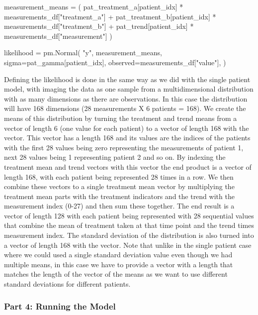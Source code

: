 \documentclass[12pt,a4paper,leqno]{report}
\theoremstyle{plain}
\theoremstyle{definition}
\theoremstyle{remark}
\begin{document}
\bigskip
\begin{pyverbatim}[][fontsize=\footnotesize]
    measurement_means = (
        pat_treatment_a[patient_idx] * measurements_df["treatment_a"]
        + pat_treatment_b[patient_idx] * measurements_df["treatment_b"]
        + pat_trend[patient_idx] * measurements_df["measurement"]
    )

    likelihood = pm.Normal(
        "y",
        measurement_means,
        sigma=pat_gamma[patient_idx],
        observed=measurements_df["value"],
    )
\end{pyverbatim}
\smallskip


Defining the likelihood is done in the same way as we did with the single patient model,
with imaging the data as one sample from a multidimensional distribution with as many
dimensions as there are observations. In this case the
distribution will have 168 dimensions (28 measurements X 6 patients = 168). We
create the means of this distribution by turning the treatment and trend means from
a vector of length 6 (one value for each patient) to a vector of length 168 with the
 vector. This vector has a length 168 and its values are the indices of the
patients with the first 28 values being
zero representing the measurements of patient 1, next 28 values being 1 representing
patient 2 and so on. By indexing the treatment mean and trend vectors with this vector the end
product is a vector of length 168, with each patient being represented 28 times
in a row. We then combine these vectors to a single treatment mean vector by multiplying
the treatment mean parts with the treatment indicators and the trend with the
measurement index (0-27) and then sum these together. The end result is a
vector of length 128 with each patient being represented with 28 sequential values that
combine the mean of treatment taken at that time point and the trend times measurement index. The standard
deviation of the distribution is also turned into a vector of length 168 with the
 vector. Note that unlike in the single patient case where we could used a single
standard deviation value even though we had multiple means, in this case we have to
provide a vector with a length that matches the length of the vector of the means as we
want to use different standard deviations for different patients.

\subsubsection*{Part 4: Running the Model}
\end{document}

